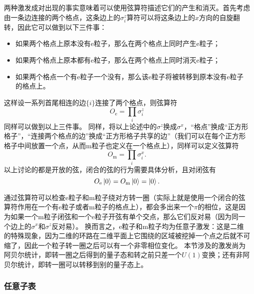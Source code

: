 \documentclass[hyperref, UTF8, a4paper]{ctexart}
\begin{document}
两种激发成对出现的事实意味着可以使用弦算符描述它们的产生和消灭。首先考虑由一条边连接的两个格点，这条边上的${\sigma}^z_i$算符可以将这条边上的$x$方向的自旋翻转，因此它可以做到以下三件事：
\begin{itemize}
    \item 如果两个格点上原本没有e粒子，那么在两个格点上同时产生e粒子；
    \item 如果两个格点上原本都有e粒子，那么在两个格点上同时消灭e粒子； 
    \item 如果两个格点一个有e粒子一个没有，那么该e粒子将被转移到原本没有e粒子的格点上。
\end{itemize}
这样设一系列首尾相连的边$\{i\}$连接了两个格点，则弦算符
\begin{equation}
    {O}_\text{e} = \prod_{i} {\sigma}_i^z
\end{equation}
同样可以做到以上三件事。
同样，将以上论述中的${\sigma}^z$换成${\sigma}^x$，“格点”换成“正方形格子”，“连接两个格点的边”换成“正方形格子共享的边”（我们可以在每个正方形格子中间放置一个点，从而m粒子也定义在一个格点上），同样可以定义弦算符
\begin{equation}
    {O}_\text{m} = \prod_{i} {\sigma}_i^x.
\end{equation}
以上讨论的都是开放的弦，闭合的弦的行为需要具体分析，且对闭弦有
\begin{equation}
    {O}_\text{e} \ket{0} = {O}_\text{m} \ket{0} = \ket{0}.
\end{equation}

通过弦算符可以检查e粒子和m粒子绕对方转一圈（实际上就是使用一个闭合的弦算符作用在一个有e粒子或者m粒子的格点上），都会多出来一个$\pi$的相位，这是因为如果一个m粒子闭弦和一个e粒子开弦有单个交点，那么它们反对易（因为同一个边上的${\sigma}^x$和${\sigma}^z$反对易）。
换而言之，e粒子和m粒子均为任意子激发：这是二维的特殊现象，因为二维的环路在二维平面上它围绕的区域被挖掉一个点之后就不可缩了，因此一个粒子转一圈之后可以有一个非零相位变化。
本节涉及的激发尚为阿贝尔统计，即转一圈之后得到的量子态和转之前只差一个$U(1)$变换；还有非阿贝尔统计，即转一圈可以转移到别的量子态上。

\subsubsection{任意子表}
\end{document}
